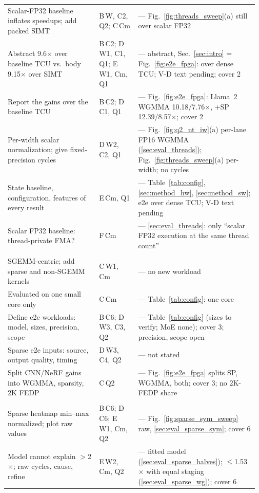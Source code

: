 \begin{longtable}{@{}p{0.355\linewidth} p{0.155\linewidth} p{0.46\linewidth}@{}}
Scalar-FP32 baseline inflates speedups; add packed SIMT & B\,W, C2, Q2; C\,Cm & \stO{} --- Fig.~\ref{fig:threads_sweep}(a) still over scalar FP32 \\
Abstract 9.6$\times$ over baseline TCU vs.\ body 9.15$\times$ over SIMT & B\,C2; D\,W1, C1, Q1; E\,W1, Cm, Q1 & \stP{} --- abstract, Sec.~\ref{sec:intro} = Fig.~\ref{fig:e2e_fpga}: over dense TCU; V-D text pending; cover 2 \\
Report the gains over the baseline TCU & B\,C2; D\,C1, Q1 & \stR{} --- Fig.~\ref{fig:e2e_fpga}: Llama~2 WGMMA 10.18/7.76$\times$, +SP 12.39/8.57$\times$; cover 2 \\
Per-width scalar normalization; give fixed-precision cycles & D\,W2, C2, Q1 & \stP{} --- Fig.~\ref{fig:q2_nt_iw}(a) per-lane FP16 WGMMA (\ref{sec:eval_threads}); Fig.~\ref{fig:threads_sweep}(a) per-width; no cycles \\
State baseline, configuration, features of every result & E\,Cm, Q1 & \stP{} --- Table~\ref{tab:config}, \ref{sec:method_hw}, \ref{sec:method_sw}; e2e over dense TCU; V-D text pending \\
Scalar FP32 baseline: thread-private FMA? & F\,Cm & \stO{} --- \ref{sec:eval_threads}: only ``scalar FP32 execution at the same thread count'' \\
\rowcolor{gray!18}\multicolumn{3}{@{}l@{}}{\textbf{Workloads and end-to-end evaluation}} \\
SGEMM-centric; add sparse and non-SGEMM kernels & C\,W1, Cm & \stO{} --- no new workload \\
Evaluated on one small core only & C\,Cm & \stO{} --- Table~\ref{tab:config}: one core \\
Define e2e workloads: model, sizes, precision, scope & B\,C6; D\,W3, C3, Q2 & \stP{} --- Table~\ref{tab:config} (sizes to verify; MoE none); cover 3; precision, scope open \\
Sparse e2e inputs: source, output quality, timing & D\,W3, C4, Q2 & \stO{} --- not stated \\
Split CNN/NeRF gains into WGMMA, sparsity, 2K FEDP & C\,Q2 & \stP{} --- Fig.~\ref{fig:e2e_fpga} splits SP, WGMMA, both; cover 3; no 2K-FEDP share \\
\rowcolor{gray!18}\multicolumn{3}{@{}l@{}}{\textbf{Sparsity results and model}} \\
Sparse heatmap min--max normalized; plot raw values & B\,C6; D\,C6; E\,W1, Cm, Q2 & \stR{} --- Fig.~\ref{fig:sparse_sym_sweep} raw, \ref{sec:eval_sparse_sym}; cover 6 \\
Model cannot explain $>$2$\times$; raw cycles, cause, refine & E\,W2, Cm, Q2 & \stR{} --- fitted model (\ref{sec:eval_sparse_halves}); $\leq$1.53$\times$ with equal staging (\ref{sec:eval_sparse_wg}); cover 6 \\

\end{longtable}
